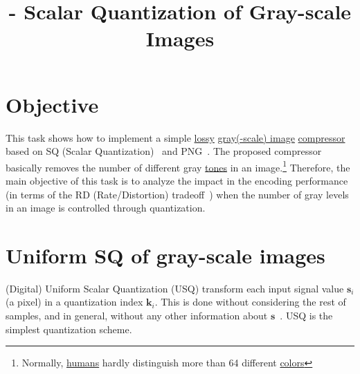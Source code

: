 

\title{\SM{} - Scalar Quantization of Gray-scale Images}

\maketitle
\tableofcontents

\section{Objective}
This task shows how to implement a simple
\href{https://en.wikipedia.org/wiki/Lossy_compression}{lossy}
\href{https://en.wikipedia.org/wiki/Grayscale}{gray(-scale) image}
\href{https://en.wikipedia.org/wiki/Image_compression}{compressor}~\cite{vruiz__image_IO}
based on SQ (Scalar
Quantization)~\cite{vruiz__scalar_quantization,sayood2017introduction,vetterli2014foundations}
and PNG~\cite{vruiz__PNG}. The proposed compressor basically removes
the number of different gray
\href{https://en.wikipedia.org/w/index.php?title=Tone_(color)&redirect=no}{tones}
in an image.\footnote{Normally,
\href{https://en.wikipedia.org/wiki/Visual_system}{humans} hardly
distinguish more than 64 different
\href{https://en.wikipedia.org/wiki/Color}{colors}} Therefore, the
main objective of this task is to analyze the impact in the encoding
performance (in terms of the RD (Rate/Distortion)
tradeoff~\cite{vruiz__information_theory}) when the number of gray
levels in an image is controlled through quantization.

\section{Uniform SQ of gray-scale images}
(Digital) Uniform Scalar Quantization (USQ) transform each input signal value
$\mathbf{s}_i$ (a pixel) in a quantization index $\mathbf{k}_i$. This
is done without considering the rest of samples, and in general,
without any other information about
$\mathbf{s}$~\cite{vruiz__scalar_quantization}. USQ is the simplest
quantization scheme.

